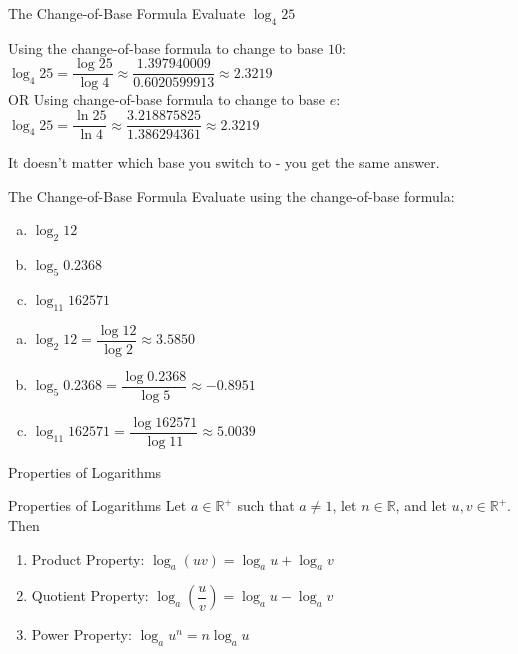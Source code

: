 \documentclass[t, aspectratio=169]{beamer}
\def\R{\mathbb{R}} %
\newcommand{\fp}[1]{\left({#1}\right)} %
\begin{document}
	\begin{frame}{The Change-of-Base Formula}
		Evaluate $\log_4 25$ \pause
		
		Using the change-of-base formula to change to base $10$: \\ $\log_4 25 = \dfrac{\log 25}{\log 4} \approx \dfrac{1.397940009}{0.6020599913} \approx 2.3219$ \vspace{8pt} \\ \pause
		OR Using change-of-base formula to change to base $e$: \\ $\log_4 25 = \dfrac{\ln 25}{\ln 4} \approx \dfrac{3.218875825}{1.386294361} \approx 2.3219$ \pause \vspace{18pt}
		
		It doesn't matter which base you switch to - you get the same answer.
	\end{frame}

	\begin{frame}{The Change-of-Base Formula}
		Evaluate using the change-of-base formula: \begin{enumerate}[a)]
			\item $\log_2 12$
			\item $\log_5 0.2368$
			\item $\log_{11} 162571$
		\end{enumerate} \pause
		\begin{enumerate}[a)]
			\item $\log_2 12 = \dfrac{\log 12}{\log 2} \approx 3.5850$
			\item $\log_5 0.2368 = \dfrac{\log 0.2368}{\log 5} \approx -0.8951$
			\item $\log_{11} 162571 = \dfrac{\log 162571}{\log 11} \approx 5.0039$
		\end{enumerate}
	\end{frame}

	\begin{frame}{Properties of Logarithms}
		\begin{block}{Properties of Logarithms}
			Let $a\in\R^+$ such that $a \neq 1$, let $n \in \R$, and let $u,v\in\R^+$. Then \begin{enumerate}[1)]
				\item Product Property: $\log_a (uv) = \log_a u + \log_a v$
				\item Quotient Property: $\log_a \fp{\dfrac{u}{v}} = \log_a u - \log_a v$
				\item Power Property: $\log_a u^n = n \log_a u$
			\end{enumerate}
		\end{block}
	\end{frame}
\end{document}
